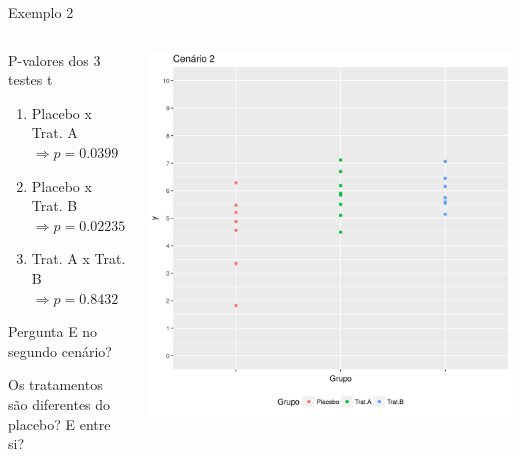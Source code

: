 \documentclass{beamer}
\begin{document}
\begin{frame}{Exemplo 2}
  \begin{columns}
    \begin{column}{5cm}
      \begin{exampleblock}{P-valores dos 3 testes t}
        \tiny
        \begin{enumerate}
        \item Placebo x Trat. A $\Rightarrow p=0.0399$
        \item Placebo x Trat. B $\Rightarrow p=0.02235$
        \item Trat. A x Trat. B $\Rightarrow p=0.8432$
        \end{enumerate}
      \end{exampleblock}
      \begin{exampleblock}{Pergunta}
        \small
        E no segundo cenário?

        Os tratamentos são diferentes do placebo?
        E entre si?
      \end{exampleblock}
    \end{column}
    \begin{column}{5cm}
      \includegraphics[width=\textwidth]{Topicos_adv/cenario2}
    \end{column}
  \end{columns}
\end{frame}
\end{document}
